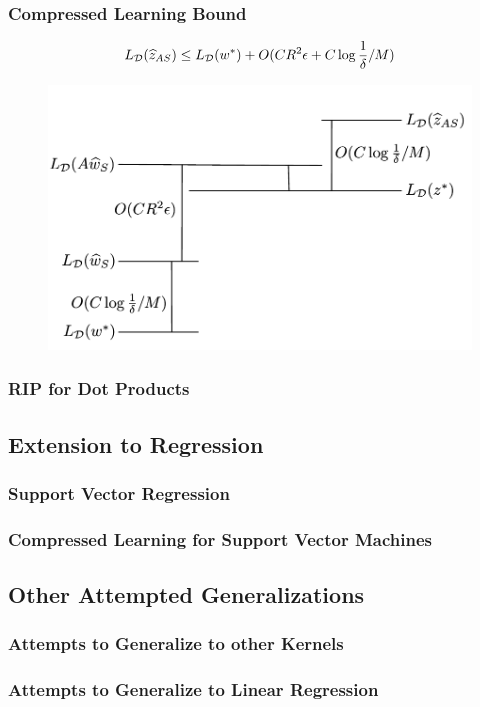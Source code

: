 \documentclass[aspectratio=34]{beamer}
\begin{document}
\begin{frame}
    \frametitle{Compressed Learning Bound}
    $$L_{\cal D}(\widehat{z}_{AS}) \leq L_{\cal D}(w^*) + O(CR^2\epsilon + C\log\frac{1}{\delta} / M)  $$
    \begin{figure}
        \includegraphics[width=\columnwidth]{bounds_argument_figure.pdf}
    \end{figure}
\end{frame}

\begin{frame}
    \frametitle{RIP for Dot Products}
\end{frame}

\subsection{Extension to Regression}

\begin{frame}
    \frametitle{Support Vector Regression}
\end{frame}

\begin{frame}
    \frametitle{Compressed Learning for Support Vector Machines}
\end{frame}

\subsection{Other Attempted Generalizations}

\begin{frame}
    \frametitle{Attempts to Generalize to other Kernels}
\end{frame}

\begin{frame}
    \frametitle{Attempts to Generalize to Linear Regression}
\end{frame}
\end{document}
